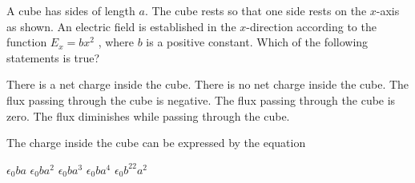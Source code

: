 \documentclass{../../oss-apphys-exam}
\begin{document}
\begin{multicols*}{2}
\begin{questions}
%    

    \question A cube has sides of length $a$. The cube rests so that one side
    rests on the $x$-axis as shown. An electric field is established in the
    $x$-direction according to the function $E_x=bx^2$ , where $b$ is a positive
    constant. Which of the following statements is true?
    \label{cube1}
    \begin{choices}
      \choice There is a net charge inside the cube.
      \choice There is no net charge inside the cube.
      \choice The flux passing through the cube is negative.
      \choice The flux passing through the cube is zero.
      \choice The flux diminishes while passing through the cube.
    \end{choices}
    
    \question The charge inside the cube can be expressed by the equation
    \label{cube2}
    \begin{choices}
      \choice $\epsilon_0ba$
      \choice $\epsilon_0ba^2$
      \choice $\epsilon_0ba^3$
      \choice $\epsilon_0ba^4$
      \choice $\epsilon_0b^22a^2$
    \end{choices}
    

\end{questions}
\end{multicols*}
\end{document}
